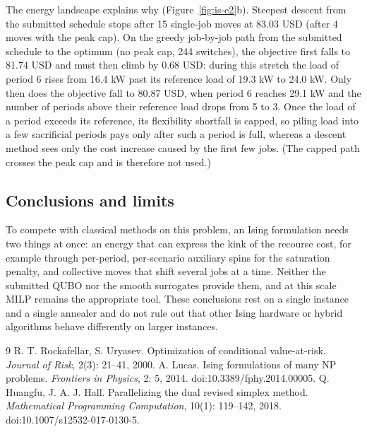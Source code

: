 The energy landscape explains why (Figure~\ref{fig:is-e2}b). Steepest descent from the submitted schedule stops after 15 single-job moves at 83.03 USD (after 4 moves with the peak cap). On the greedy job-by-job path from the submitted schedule to the optimum (no peak cap, 244 switches), the objective first falls to 81.74 USD and must then climb by 0.68 USD: during this stretch the load of period 6 rises from 16.4 kW past its reference load of 19.3 kW to 24.0 kW. Only then does the objective fall to 80.87 USD, when period 6 reaches 29.1 kW and the number of periods above their reference load drops from 5 to 3. Once the load of a period exceeds its reference, its flexibility shortfall is capped, so piling load into a few sacrificial periods pays only after such a period is full, whereas a descent method sees only the cost increase caused by the first few jobs. (The capped path crosses the peak cap and is therefore not used.)

\subsection{Conclusions and limits}
To compete with classical methods on this problem, an Ising formulation needs two things at once: an energy that can express the kink of the recourse cost, for example through per-period, per-scenario auxiliary spins for the saturation penalty, and collective moves that shift several jobs at a time. Neither the submitted QUBO nor the smooth surrogates provide them, and at this scale MILP remains the appropriate tool. These conclusions rest on a single instance and a single annealer and do not rule out that other Ising hardware or hybrid algorithms behave differently on larger instances.

\begin{thebibliography}{9}
 R. T. Rockafellar, S. Uryasev. Optimization of conditional value-at-risk. \emph{Journal of Risk}, 2(3): 21--41, 2000.
 A. Lucas. Ising formulations of many NP problems. \emph{Frontiers in Physics}, 2: 5, 2014. doi:10.3389/fphy.2014.00005.
 Q. Huangfu, J. A. J. Hall. Parallelizing the dual revised simplex method. \emph{Mathematical Programming Computation}, 10(1): 119--142, 2018. doi:10.1007/s12532-017-0130-5.
\end{thebibliography}

